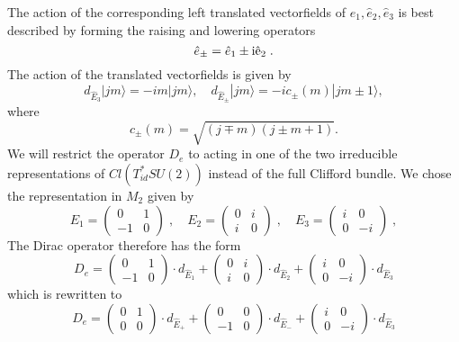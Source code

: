 \documentclass[12pt]{article}
\begin{document}
{ The action of the corresponding left translated vectorfields of $\hat{e}_1,\hat{e}_2,\hat{e}_3$ is  best described by forming the raising and lowering operators
\[
\hat{e}_\pm = \hat{e}_1 \pm \rm{i}\hat{e}_2\;.
\]
The action of the translated vectorfields is given by
$$d_{\hat{E}_3}|jm\rangle =-im|jm\rangle,\quad d_{\hat{E}_\pm} |jm\rangle=-ic_\pm (m)|jm\pm 1\rangle,$$
where
$$c_\pm (m)= \sqrt{(j\mp m)(j\pm m+1)}.$$
We will restrict the operator $D_e$ to acting in one of the two irreducible representations of $Cl(T^*_{id}SU(2))$ instead of the full Clifford bundle. We chose the representation in $M_2$ given by
\[
E_1 = \left(
\begin{array}{cc}
0  & 1 \\
-1 & 0
\end{array}
\right)
\;,\quad
E_2 = \left(
\begin{array}{cc}
0  & i \\
i & 0
\end{array}
\right)
\;,\quad
E_3 = \left(
\begin{array}{cc}
i  & 0 \\
0 & -i
\end{array}
\right)
\;,
\]
The Dirac operator therefore has the form
\[
D_e=
\left( 
\begin{array}{cc}
0  & 1 \\
-1 & 0
\end{array}
\right)
\cdot d_{\hat{E}_1}
+
\left( 
\begin{array}{cc}
0  & i \\
i & 0
\end{array}
\right)
\cdot d_{\hat{E}_2}
+
\left( 
\begin{array}{cc}
i  & 0 \\
0 & -i
\end{array}
\right)
\cdot d_{\hat{E}_3}
\]
which is rewritten to
\[
D_e=
\left( 
\begin{array}{cc}
0  & 1 \\
0 & 0
\end{array}
\right)
\cdot d_{\hat{E}_+}
+
\left( 
\begin{array}{cc}
0  & 0 \\
-1 & 0
\end{array}
\right)
\cdot d_{\hat{E}_-}
+
\left( 
\begin{array}{cc}
i  & 0 \\
0 & -i
\end{array}
\right)
\cdot d_{\hat{E}_3}
\]
}
\end{document}
